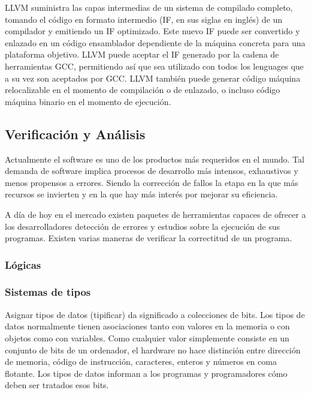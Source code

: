 LLVM suministra las capas intermedias de un sistema de compilado completo, tomando el c\'odigo en formato intermedio (IF, en sus siglas en ingl\'es) de un compilador y emitiendo un IF optimizado. Este nuevo IF puede ser convertido y enlazado en un c\'odigo ensamblador dependiente de la m\'aquina concreta para una plataforma objetivo. LLVM puede aceptar el IF generado por la cadena de herramientas GCC, permitiendo as\'i que sea utilizado con todos los lenguages que a su vez son aceptados por GCC. LLVM tambi\'en puede generar c\'odigo m\'aquina relocalizable en el momento de compilaci\'on o de enlazado, o incluso c\'odigo m\'aquina binario en el momento de ejecuci\'on.

\subsection{Verificaci\'on y An\'alisis}

Actualmente el software es uno de los productos m\'as requeridos en el mundo. Tal demanda de software implica procesos de desarrollo m\'as intensos, exhaustivos y menos propensos a errores. Siendo la correcci\'on de fallos la etapa en la que m\'as recursos se invierten y en la que hay m\'as inter\'es por mejorar su eficiencia. 

A d\'ia de hoy en el mercado existen paquetes de herramientas capaces de ofrecer a los desarrolladores detecci\'on de errores y estudios sobre la ejecuci\'on de sus programas. Existen varias maneras de verificar la correctitud de un programa.

\subsubsection*{L\'ogicas}
\label{ap2:sec:logicas}



\subsubsection*{Sistemas de tipos}

Asignar tipos de datos (tipificar) da significado a colecciones de bits. Los tipos de datos normalmente tienen asociaciones tanto con valores en la memoria o con objetos como con variables. Como cualquier valor simplemente consiste en un conjunto de bits de un ordenador, el hardware no hace distinci\'on entre direcci\'on de memoria, c\'odigo de instrucci\'on, caracteres, enteros y n\'umeros en coma flotante. Los tipos de datos informan a los programas y programadores c\'omo deben ser tratados esos bits.


